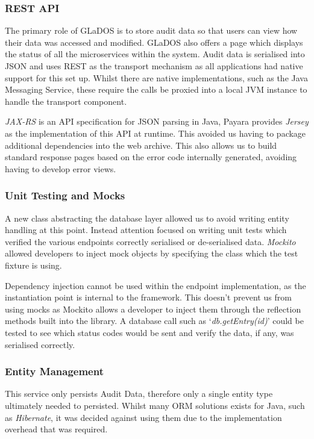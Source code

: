 \subsubsection{REST API}
\par
The primary role of GLaDOS is to store audit data so that users can view how their data was accessed and modified. GLaDOS also offers a page which displays the status of all the microservices within the system. Audit data is serialised into JSON and uses REST as the transport mechanism as all applications had native support for this set up. Whilst there are native implementations, such as the Java Messaging Service, these require the calls be proxied into a local JVM instance to handle the transport component.

\par
\textit{JAX-RS} is an API specification for JSON parsing in Java, Payara provides \textit{Jersey} as the implementation of this API at runtime. This avoided us having to package additional dependencies into the web archive. This also allows us to build standard response pages based on the error code internally generated, avoiding having to develop error views.        

\subsubsection{Unit Testing and Mocks}
\par
A new class abstracting the database layer allowed us to avoid writing entity handling at this point. Instead attention focused on writing unit tests which verified the various endpoints correctly serialised or de-serialised data. \textit{Mockito}\cite{Mockito} allowed developers to inject mock objects by specifying the class which the test fixture is using.

\par
Dependency injection cannot be used within the endpoint implementation, as the instantiation point is internal to the framework. This doesn't prevent us from using mocks as Mockito allows a developer to inject them through the reflection methods built into the library. A database call such as `\textit{db.getEntry(id)}' could be tested to see which status codes would be sent and verify the data, if any, was serialised correctly.

\subsubsection{Entity Management}
This service only persists Audit Data, therefore only a single entity type ultimately needed to persisted. Whilst many ORM solutions exists for Java, such as \textit{Hibernate}, it was decided against using them due to the implementation overhead that was required.

